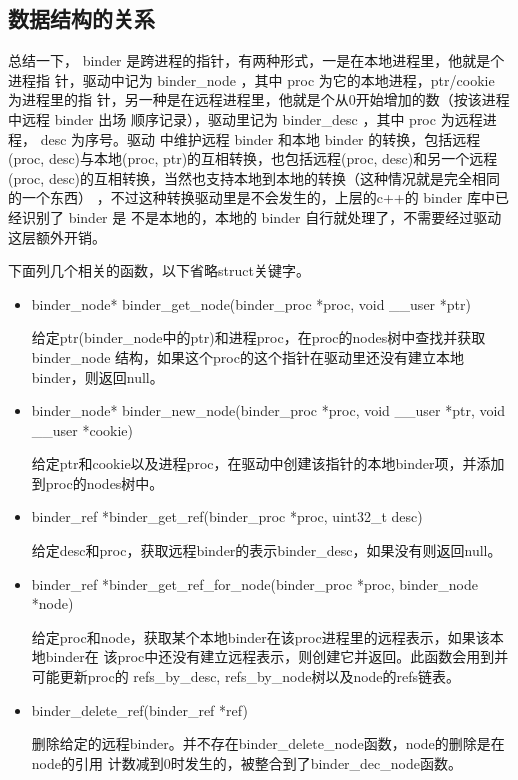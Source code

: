 \documentclass[a4paper,11pt]{article}
\begin{document}
 
\subsection{数据结构的关系}
总结一下， binder 是跨进程的指针，有两种形式，一是在本地进程里，他就是个进程指
针，驱动中记为 binder_node ，其中 proc 为它的本地进程，ptr/cookie 为进程里的指
针，另一种是在远程进程里，他就是个从0开始增加的数（按该进程中远程 binder 出场
顺序记录），驱动里记为 binder_desc ，其中 proc 为远程进程， desc 为序号。驱动
中维护远程 binder 和本地 binder 的转换，包括远程(proc, desc)与本地(proc,
ptr)的互相转换，也包括远程(proc, desc)和另一个远程(proc,
desc)的互相转换，当然也支持本地到本地的转换（这种情况就是完全相同的一个东西）
，不过这种转换驱动里是不会发生的，上层的c++的 binder 库中已经识别了 binder 是
不是本地的，本地的 binder 自行就处理了，不需要经过驱动这层额外开销。


下面列几个相关的函数，以下省略struct关键字。
\begin{itemize}
    \item binder_node* binder_get_node(binder_proc *proc, void __user *ptr)

        给定ptr(binder_node中的ptr)和进程proc，在proc的nodes树中查找并获取binder_node
        结构，如果这个proc的这个指针在驱动里还没有建立本地binder，则返回null。

    \item binder_node* binder_new_node(binder_proc *proc, void __user *ptr, void __user *cookie)

        给定ptr和cookie以及进程proc，在驱动中创建该指针的本地binder项，并添加到proc的nodes树中。

    \item binder_ref *binder_get_ref(binder_proc *proc, uint32_t desc)

        给定desc和proc，获取远程binder的表示binder_desc，如果没有则返回null。

    \item binder_ref *binder_get_ref_for_node(binder_proc *proc, binder_node *node)

        给定proc和node，获取某个本地binder在该proc进程里的远程表示，如果该本地binder在
        该proc中还没有建立远程表示，则创建它并返回。此函数会用到并可能更新proc的
        refs_by_desc, refs_by_node树以及node的refs链表。

    \item binder_delete_ref(binder_ref *ref)

        删除给定的远程binder。并不存在binder_delete_node函数，node的删除是在node的引用
        计数减到0时发生的，被整合到了binder_dec_node函数。
\end{itemize}
\end{document}
